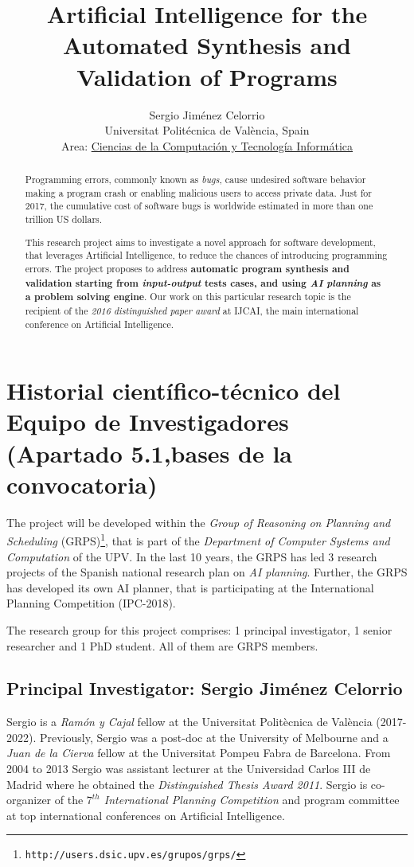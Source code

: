\documentclass[10pt,a4paper]{paper}
\title{Artificial Intelligence for the Automated Synthesis and Validation of Programs}
\author{Sergio Jim\'enez Celorrio\\
\footnotesize Universitat Politécnica de València, Spain\\
\small Area: \underline{Ciencias de la Computación y Tecnología Informática}}
\begin{document}
\maketitle

\begin{abstract}
Programming errors, commonly known as {\em bugs}, cause undesired software behavior making a program crash or enabling malicious users to access private data. Just for 2017, the cumulative cost of software bugs is worldwide estimated in more than one trillion US dollars. 

This research project aims to investigate a novel approach for software development, that leverages Artificial Intelligence, to reduce the chances of introducing programming errors. The project proposes to address {\bf automatic program synthesis and validation starting from {\em input-output} tests cases, and using {\em AI planning} as a problem solving engine}. Our work on this particular research topic is the recipient of the {\em 2016 distinguished paper award} at {\sc IJCAI}, the main international conference on Artificial Intelligence.
\end{abstract}

\section{Historial científico-técnico del Equipo de Investigadores (Apartado 5.1,bases de la convocatoria)}

The project will be developed within the {\em Group of Reasoning on Planning and Scheduling} (GRPS){\footnote{\tt http://users.dsic.upv.es/grupos/grps/}}, that is part of the {\em Department of Computer Systems and Computation} of the UPV. In the last 10 years, the GRPS has led 3 research projects of the Spanish national research plan on {\em AI planning}. Further, the GRPS has developed its own AI planner, that is participating  at the International Planning Competition (IPC-2018).

The research group for this project comprises: 1 principal investigator, 1 senior researcher and 1 PhD student. All of them are GRPS members. 

\subsection{Principal Investigator: Sergio Jiménez Celorrio}
Sergio is a {\em Ramón y Cajal} fellow at the Universitat Politècnica de València (2017-2022). Previously, Sergio was a post-doc at the University of Melbourne and a {\em Juan de la Cierva} fellow at the Universitat Pompeu Fabra de Barcelona. From 2004 to 2013 Sergio was assistant lecturer at the Universidad Carlos III de Madrid where he obtained the {\em Distinguished Thesis Award 2011}. Sergio is co-organizer of the {\em $7^{th}$ International Planning Competition} and program committee at top international conferences on Artificial Intelligence.
\end{document}
